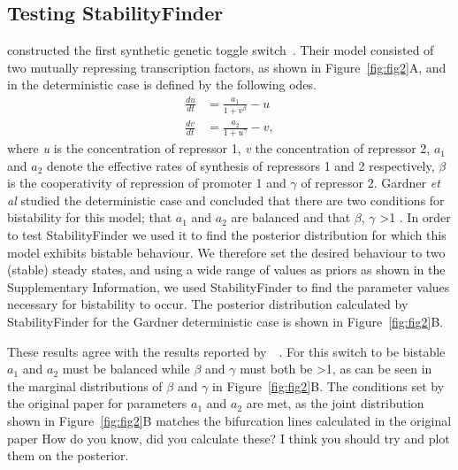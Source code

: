 \subsection{Testing StabilityFinder}

\textcite{Gardner:2000vha} constructed the first synthetic genetic toggle switch~\autocite{Gardner:2000vha}. Their model consisted of two mutually repressing transcription factors, as shown in Figure~\ref{fig:fig2}A, and in the deterministic case is defined by the following \acrshort{ode}s.
\begin{align*}
\frac{du}{dt} &= \frac{a_1}{1+v^{\beta}} - u\\
\frac{dv}{dt} &= \frac{a_2}{1+u^{\gamma }} - v,
\end{align*}
where \textit{u} is the concentration of repressor 1, \textit{v} the concentration of repressor 2, $a_1$ and $a_2$ denote the effective rates of synthesis of repressors 1 and 2 respectively,  \textit{$\beta$} is the cooperativity of repression of promoter 1 and \textit{$\gamma$} of repressor 2. Gardner \textit{et al} studied the deterministic case and concluded that there are two conditions for bistability for this model; that $a_1$ and $a_2$ are balanced and that $\beta$, $\gamma$ \textgreater 1 \autocite{Gardner:2000vha}. In order to test StabilityFinder we used it to find the posterior distribution for which this model exhibits bistable behaviour. We therefore set the desired behaviour to two (stable) steady states, and using a wide range of values as priors as shown in the Supplementary Information, we used StabilityFinder to find the parameter values necessary for bistability to occur. The posterior distribution calculated by StabilityFinder for the Gardner deterministic case is shown in Figure~\ref{fig:fig2}B.
\par
These results agree with the results reported by~\textcite{Gardner:2000vha}~\autocite{Gardner:2000vha}. For this switch to be bistable $a_1$ and $a_2$ must be balanced while $\beta$ and $\gamma$ must both be \textgreater 1, as can be seen in the marginal distributions of $\beta$ and $\gamma$ in Figure~\ref{fig:fig2}B. The conditions set by the original paper for parameters $a_1$ and $a_2$ are met, as the joint distribution shown in Figure~\ref{fig:fig2}B matches the bifurcation lines calculated in the original paper {\color{red} How do you know, did you calculate these? I think you should try and plot them on the posterior}. 

